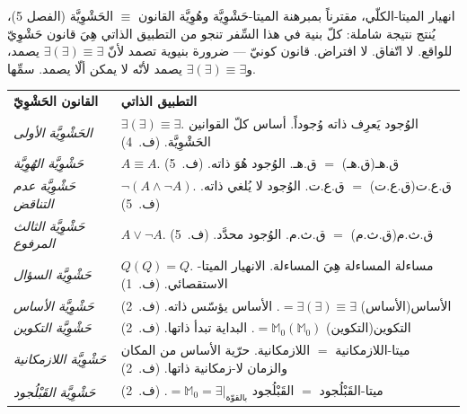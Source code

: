 \documentclass[10pt, openany, oneside]{book}
\renewcommand{\footnotesize}{\fontsize{8.5}{11}\selectfont}
\begin{document}
انهيار الميتا-الكلّي، مقترناً بمبرهنة الميتا-حَشْوِيَّة وهُوِيَّة القانون $\equiv$ الحَشْوِيَّة (الفصل 5)، يُنتج نتيجة شاملة: كلّ بنية في هذا السِّفر تنجو من التطبيق الذاتي هِيَ قانون حَشْوِيّ للواقع. لا اتّفاق. لا افتراض. قانون كونيّ --- ضرورة بنيوية تصمد لأنّ $\exists(\exists) \equiv \exists$ يصمد، و$\exists(\exists) \equiv \exists$ يصمد لأنّه لا يمكن ألّا يصمد. سمِّها.

\vspace{0.5em}

{\footnotesize
\noindent\begin{tabular}{@{} p{} @{\hspace{0.5em}} p{} @{}}
\textbf{القانون الحَشْوِيّ} & \textbf{التطبيق الذاتي} \\[0.5em]

\textit{الحَشْوِيَّة الأولى} & $\exists(\exists) \equiv \exists$. الوُجود يَعرِف ذاته وُجوداً. أساس كلّ القوانين الحَشْوِيَّة. (ف.\ 4) \\[0.3em]

\textit{حَشْوِيَّة الهُوِيَّة} & $A \equiv A$. ق.هـ(ق.هـ) $=$ ق.هـ. الوُجود هُوَ ذاته. (ف.\ 5) \\[0.3em]

\textit{حَشْوِيَّة عدم التناقض} & $\neg(A \wedge \neg A)$. ق.ع.ت(ق.ع.ت) $=$ ق.ع.ت. الوُجود لا يُلغي ذاته. (ف.\ 5) \\[0.3em]

\textit{حَشْوِيَّة الثالث المرفوع} & $A \vee \neg A$. ق.ث.م(ق.ث.م) $=$ ق.ث.م. الوُجود محدَّد. (ف.\ 5) \\[0.3em]

\textit{حَشْوِيَّة السؤال} & $Q(Q) = Q$. مساءلة المساءلة هِيَ المساءلة. الانهيار الميتا-الاستقصائي. (ف.\ 1) \\[0.3em]

\textit{حَشْوِيَّة الأساس} & الأساس(الأساس) $= \exists(\exists) \equiv \exists$. الأساس يؤسّس ذاته. (ف.\ 2) \\[0.3em]

\textit{حَشْوِيَّة التكوين} & التكوين(التكوين) $= \mathbb{M}_0(\mathbb{M}_0)$. البداية تبدأ ذاتها. (ف.\ 2) \\[0.3em]

\textit{حَشْوِيَّة اللازمكانية} & ميتا-اللازمكانية $=$ اللازمكانية. حرّية الأساس من المكان والزمان لا-زمكانية ذاتها. (ف.\ 2) \\[0.3em]

\textit{حَشْوِيَّة القَبْلُجود} & ميتا-القَبْلُجود $=$ القَبْلُجود $= \mathbb{M}_0 = \exists|_{\text{بالقوّة}}$. (ف.\ 2) \\[0.3em]


\end{tabular}}
\end{document}

